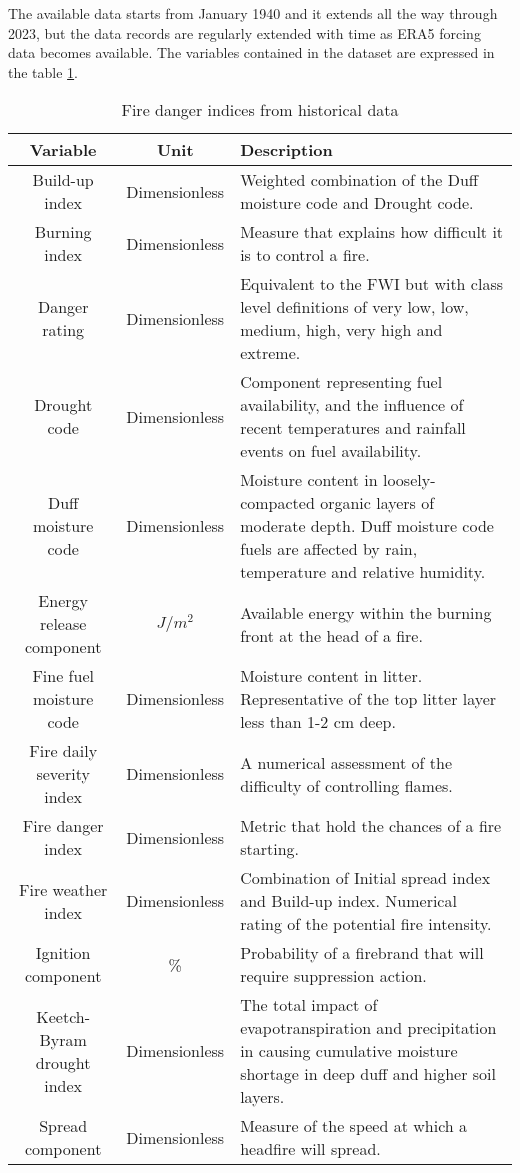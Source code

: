 The available data starts from January 1940 and it extends all the way through 2023, but the data records are regularly extended with time as ERA5 forcing data becomes available. The variables contained in the dataset are expressed in the table \ref{copernicus_danger_indices}.


\begin{table}[h!]

\caption{Fire danger indices from historical data}
\label{copernicus_danger_indices}
\centering
\small
\begin{tabular}{|c|c|p{7.5cm}|} %
\hline
\textbf{Variable} & \textbf{Unit} & \textbf{Description}\\
\hline
Build-up index & Dimensionless & Weighted combination of the Duff moisture code and Drought code. \\
\hline
Burning index & Dimensionless & Measure that explains how difficult it is to control a fire. \\
\hline
Danger rating & Dimensionless & Equivalent to the FWI but with class level definitions of very low, low, medium, high, very high and extreme. \\
\hline
Drought code & Dimensionless & Component representing fuel availability, and the influence of recent temperatures and rainfall events on fuel availability. \\
\hline
Duff moisture code & Dimensionless & Moisture content in loosely-compacted organic layers of moderate depth. Duff moisture code fuels are affected by rain, temperature and relative humidity. \\
\hline
Energy release component & $J/m^2$ & Available energy within the burning front at the head of a fire. \\
\hline
Fine fuel moisture code & Dimensionless &  Moisture content in litter. Representative of the top litter layer less than 1-2 cm deep. \\
\hline
Fire daily severity index & Dimensionless &  A numerical assessment of the difficulty of controlling flames. \\
\hline
Fire danger index & Dimensionless &  Metric that hold the chances of a fire starting. \\
\hline
Fire weather index & Dimensionless &  Combination of Initial spread index and Build-up index. Numerical rating of the potential fire intensity. \\
\hline
Ignition component & \% &  Probability of a firebrand that will require suppression action. \\
\hline
Keetch-Byram drought index & Dimensionless &  The total impact of evapotranspiration and precipitation in causing cumulative moisture shortage in deep duff and higher soil layers. \\
\hline
Spread component & Dimensionless &  Measure of the speed at which a headfire will spread. \\
\hline
\end{tabular}
\end{table}



